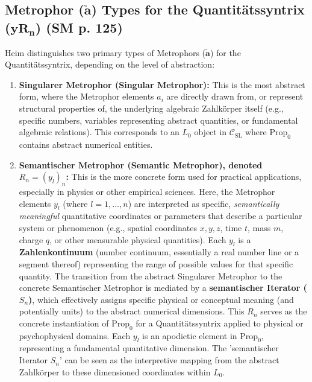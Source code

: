 \documentclass[
    12pt,              %
    a4paper,           %
    headings=normal,   %
    twoside=true,      %
    BCOR=8mm,          %
]{scrbook}
\newcommand{\metrophor}{\bm{\widetilde{a}}}
\newcommand{\quantitaetssyntrix}{\bm{yR_n}}
\newcommand{\semantischermetrophor}{R_n}
\newcommand{\semantischeriterator}{S_n}
\begin{document}
\subsection{\texorpdfstring{Metrophor (\(\metrophor\)) Types for the Quantitätssyntrix (\(\quantitaetssyntrix\)) (SM p. 125)}{Metrophor (a~) Types for the Quantitatssyntrix (yRn) (SM p. 125)}}
\label{sec:ch7_2_2_metrophor_types_quant}
Heim distinguishes two primary types of Metrophors (\(\metrophor\)) for the Quantitätssyntrix, depending on the level of abstraction:
\begin{enumerate}
    \item  \textbf{Singularer Metrophor (Singular Metrophor):} This is the most abstract form, where the Metrophor elements \(a_i\) are directly drawn from, or represent structural properties of, the underlying algebraic Zahlkörper itself (e.g., specific numbers, variables representing abstract quantities, or fundamental algebraic relations).
        This corresponds to an \(L_0\) object in \(\mathcal{C}_{\text{SL}}\) where \(\text{Prop}_0\) contains abstract numerical entities.
    \item  \textbf{Semantischer Metrophor (Semantic Metrophor), denoted \(\semantischermetrophor = (y_l)_n\):} This is the more concrete form used for practical applications, especially in physics or other empirical sciences. Here, the Metrophor elements \(y_l\) (where \(l=1, \ldots, n\)) are interpreted as specific, \textit{semantically meaningful} quantitative coordinates or parameters that describe a particular system or phenomenon (e.g., spatial coordinates \(x,y,z\), time \(t\), mass \(m\), charge \(q\), or other measurable physical quantities). Each \(y_l\) is a \textbf{Zahlenkontinuum} (number continuum, essentially a real number line or a segment thereof) representing the range of possible values for that specific quantity. The transition from the abstract Singularer Metrophor to the concrete Semantischer Metrophor is mediated by a \textbf{semantischer Iterator (\(\semantischeriterator\))}, which effectively assigns specific physical or conceptual meaning (and potentially units) to the abstract numerical dimensions.
        This \(\semantischermetrophor\) serves as the concrete instantiation of \(\text{Prop}_0\) for a Quantitätssyntrix applied to physical or psychophysical domains. Each \(y_l\) is an apodictic element in \(\text{Prop}_0\), representing a fundamental quantitative dimension. The 'semantischer Iterator \(S_n\)' can be seen as the interpretive mapping from the abstract Zahlkörper to these dimensioned coordinates within \(L_0\).
\end{enumerate}
\end{document}
